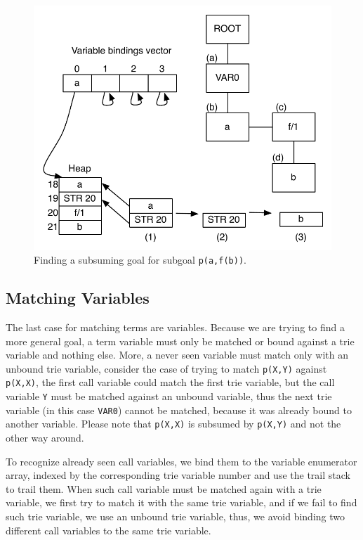 \begin{figure}[ht]
  \centering
    \includegraphics[scale=0.6]{match_functor.pdf}
  \caption{Finding a subsuming goal for subgoal \texttt{p(a,f(b))}.}
  \label{fig:match_functor}
\end{figure}

\subsection{Matching Variables}

The last case for matching terms are variables. Because we are trying to find a more general goal,
a term variable must only be matched or bound against a trie variable and nothing else. More, a
never seen variable must match only with an unbound trie variable, consider the case of trying to
match \texttt{p(X,Y)} against \texttt{p(X,X)}, the first call variable could match the first trie variable,
but the call variable \texttt{Y} must be matched against an unbound variable, thus the next trie variable
(in this case \texttt{VAR0}) cannot be matched, because it was already bound to another variable.
Please note that \texttt{p(X,X)} is subsumed by \texttt{p(X,Y)} and not the other way around.

To recognize already seen call variables, we bind them to the variable enumerator array, indexed
by the corresponding trie variable number and use the trail stack to trail them.
When such call variable must be matched again with a
trie variable, we first try to match it with the same trie variable, and if we fail to find such trie
variable, we use an unbound trie variable, thus, we avoid binding two different call variables to the same
trie variable.

